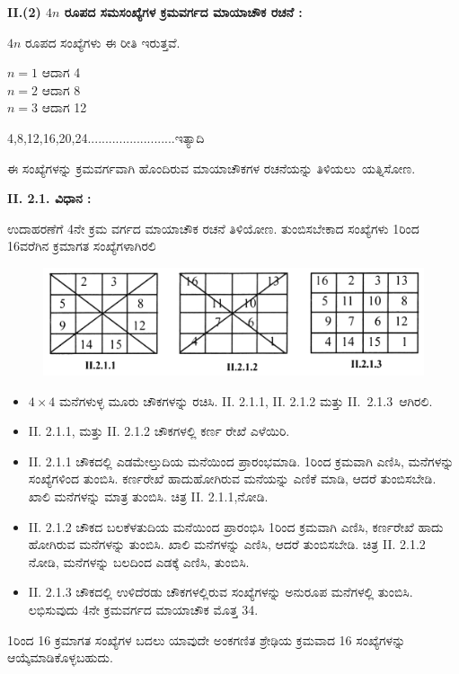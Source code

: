 \noindent \textbf{II.(2) $4n$ ರೂಪದ ಸಮಸಂಖ್ಯೆಗಳ ಕ್ರಮವರ್ಗದ ಮಾಯಾಚೌಕ ರಚನೆ :}

$4n$ ರೂಪದ ಸಂಖ್ಯೆಗಳು ಈ ರೀತಿ ಇರುತ್ತವೆ.

\begin{center}
$n=1$ ಆದಾಗ 4\\
$n=2$ ಆದಾಗ 8\\
$n=3$ ಆದಾಗ 12
\end{center}
4,8,12,16,20,24.........................ಇತ್ಯಾದಿ

ಈ ಸಂಖ್ಯೆಗಳನ್ನು ಕ್ರಮವರ್ಗವಾಗಿ ಹೊಂದಿರುವ ಮಾಯಾಚೌಕಗಳ ರಚನೆಯನ್ನು \hbox{ತಿಳಿಯಲು ಯತ್ನಿಸೋಣ.}

\noindent \textbf{II. 2.1. ವಿಧಾನ :}

ಉದಾಹರಣೆಗೆ 4ನೇ ಕ್ರಮ ವರ್ಗದ ಮಾಯಾಚೌಕ ರಚನೆ ತಿಳಿಯೋಣ. ತುಂಬಿಸ\-ಬೇಕಾದ ಸಂಖ್ಯೆಗಳು 1ರಿಂದ 16ವರೆಗಿನ ಕ್ರಮಾಗತ ಸಂಖ್ಯೆಗಳಾಗಿರಲಿ
\begin{figure}[H]
\includegraphics[scale=.9]{src/figures/chap3/fig3-16.jpg}
\end{figure}

\begin{itemize}
	\item $4 \times 4$ ಮನೆಗಳುಳ್ಳ ಮೂರು ಚೌಕಗಳನ್ನು ರಚಿಸಿ. II. 2.1.1, II. 2.1.2 ಮತ್ತು \hbox{II. 2.1.3 ಆಗಿರಲಿ.}
	\item II. 2.1.1, ಮತ್ತು II. 2.1.2 ಚೌಕಗಳಲ್ಲಿ ಕರ್ಣ ರೇಖೆ ಎಳೆಯಿರಿ.
	\item II. 2.1.1 ಚೌಕದಲ್ಲಿ ಎಡಮೇಲ್ತುದಿಯ ಮನೆಯಿಂದ ಪ್ರಾರಂಭಮಾಡಿ. 1ರಿಂದ ಕ್ರಮ\-ವಾಗಿ ಎಣಿಸಿ, ಮನೆಗಳನ್ನು ಸಂಖ್ಯೆಗಳಿಂದ ತುಂಬಿಸಿ. ಕರ್ಣರೇಖೆ ಹಾದು\-ಹೋಗಿರುವ ಮನೆಯನ್ನು ಎಣಿಕೆ ಮಾಡಿ, ಆದರೆ ತುಂಬಿಸಬೇಡಿ. ಖಾಲಿ ಮನೆಗಳನ್ನು ಮಾತ್ರ ತುಂಬಿಸಿ. ಚಿತ್ರ II. 2.1.1,ನೋಡಿ.
	\item II. 2.1.2 ಚೌಕದ ಬಲಕೆಳತುದಿಯ ಮನೆಯಿಂದ ಪ್ರಾರಂಭಿಸಿ 1ರಿಂದ ಕ್ರಮವಾಗಿ ಎಣಿಸಿ, ಕರ್ಣರೇಖೆ ಹಾದು ಹೋಗಿರುವ ಮನೆಗಳನ್ನು ತುಂಬಿಸಿ. ಖಾಲಿ ಮನೆಗಳನ್ನು ಎಣಿಸಿ, ಆದರೆ ತುಂಬಿಸಬೇಡಿ. ಚಿತ್ರ II. 2.1.2 ನೋಡಿ, ಮನೆಗಳನ್ನು ಬಲದಿಂದ ಎಡಕ್ಕೆ ಎಣಿಸಿ, ತುಂಬಿಸಿ.
	\item II. 2.1.3 ಚೌಕದಲ್ಲಿ ಉಳಿದೆರಡು ಚೌಕಗಳಲ್ಲಿರುವ ಸಂಖ್ಯೆಗಳನ್ನು ಅನುರೂಪ ಮನೆಗಳಲ್ಲಿ ತುಂಬಿಸಿ. ಲಭಿಸುವುದು 4ನೇ ಕ್ರಮವರ್ಗದ ಮಾಯಾಚೌಕ ಮೊತ್ತ 34.
\end{itemize}

1ರಿಂದ 16 ಕ್ರಮಾಗತ ಸಂಖ್ಯೆಗಳ ಬದಲು ಯಾವುದೇ ಅಂಕಗಣಿತ ಶ್ರೇಢಿಯ ಕ್ರಮವಾದ 16 ಸಂಖ್ಯೆಗಳನ್ನು ಆಯ್ಕೆಮಾಡಿಕೊಳ್ಳಬಹುದು.

